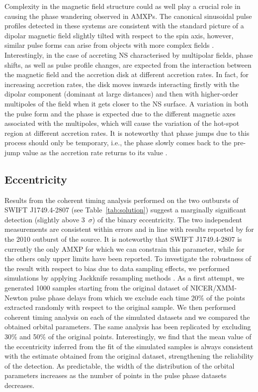 \documentclass[fleqn,usenatbib]{mnras}
\newcommand{\swiftj}{SWIFT J1749.4-2807}
\newcommand{\nicer}{NICER}
\newcommand{\xmm}{XMM-Newton}
\begin{document}
Complexity in the magnetic field structure could as well play a crucial role in causing the phase wandering observed in AMXPs. The canonical sinusoidal pulse profiles detected in these systems are consistent with the standard picture of a dipolar magnetic field slightly tilted with respect to the spin axis, however, similar pulse forms can arise from objects with more complex fields \citep[see e.g.,][]{Long:2008vb}. Interestingly, in the case of accreting NS characterised by multipolar fields, phase shifts, as well as pulse profile changes, are expected from the interaction between the magnetic field and the accretion disk at different accretion rates. In fact, for increasing accretion rates, the disk moves inwards interacting firstly with the dipolar component (dominant at large distances) and then with higher-order multipoles of the field when it gets closer to the NS surface. A variation in both the pulse form and the phase is expected due to the different magnetic axes associated with the multipoles, which will cause the variation of the hot-spot region at different accretion rates. It is noteworthy that phase jumps due to this process should only be temporary, i.e., the phase slowly comes back to the pre-jump value as the accretion rate returns to its value \citep{Long2012}.



\subsection{Eccentricity}
Results from the coherent timing analysis performed on the two outbursts of \swiftj{} (see Table~\ref{tab:solution}) suggest a marginally significant detection (slightly above 3~$\sigma$) of the binary eccentricity. The two independent measurements are consistent within errors and in line with results reported by \citet{Markwardt:2010tl} for the 2010 outburst of the source. It is noteworthy that \swiftj{} is currently the only AMXP for which we can constrain this parameter, while for the others only upper limits have been reported.  
To investigate the robustness of the result with respect to bias due to data sampling effects, we performed simulations by applying Jackknife resampling methods \citep[see e.g.,][]{Shao1995}. As a first attempt, we generated 1000 samples starting from the original dataset of \nicer{}/\xmm{} pulse phase delays from which we exclude each time 20\% of the points extracted randomly with respect to the original sample. We then performed coherent timing analysis on each of the simulated datasets and we compared the obtained orbital parameters. The same analysis has been replicated by excluding 30\% and 50\% of the original points. Interestingly, we find that the mean value of the eccentricity inferred from the fit of the simulated samples is always consistent with the estimate obtained from the original dataset, strengthening the reliability of the detection. As predictable, the width of the distribution of the orbital parameters increases as the number of points in the pulse phase datasets decreases. 
\end{document}
